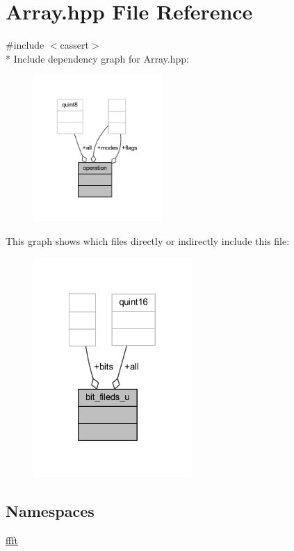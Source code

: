 \hypertarget{a00084}{\section{Array.\+hpp File Reference}
\label{a00084}
}
{\ttfamily \#include $<$cassert$>$}\\*
Include dependency graph for Array.\+hpp\+:
\nopagebreak
\begin{figure}[H]
\begin{center}
\leavevmode
\includegraphics[width=139pt]{d0/d27/a00239}
\end{center}
\end{figure}
This graph shows which files directly or indirectly include this file\+:
\nopagebreak
\begin{figure}[H]
\begin{center}
\leavevmode
\includegraphics[width=171pt]{d9/d21/a00240}
\end{center}
\end{figure}
\subsection*{Namespaces}
\begin{DoxyCompactItemize}
\item 
 \hyperlink{a00142}{ffft}
\end{DoxyCompactItemize}
